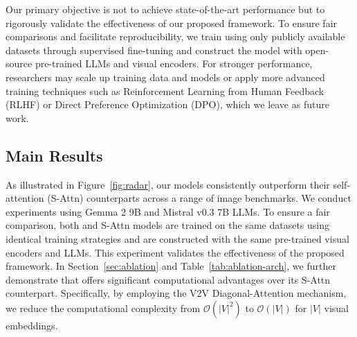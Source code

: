 Our primary objective is not to achieve state-of-the-art performance but to rigorously validate the effectiveness of our proposed \method{} framework.
To ensure fair comparisons and facilitate reproducibility, we train \method{} using only publicly available datasets through supervised fine-tuning and construct the model with open-source pre-trained LLMs and visual encoders.
For stronger performance, researchers may scale up training data and models or apply more advanced training techniques such as Reinforcement Learning from Human Feedback (RLHF)\citep{bai2022training} or Direct Preference Optimization (DPO)\citep{rafailov2024direct}, which we leave as future work.




\subsection{Main Results}

As illustrated in Figure~\ref{fig:radar}, our \method{} models consistently outperform their self-attention (S-Attn) counterparts across a range of image benchmarks.
We conduct experiments using Gemma 2 9B and Mistral v0.3 7B LLMs.
To ensure a fair comparison, both \method{} and S-Attn models are trained on the same datasets using identical training strategies and are constructed with the same pre-trained visual encoders and LLMs.
This experiment validates the effectiveness of the proposed \method{} framework.
In Section~\ref{sec:ablation} and Table~\ref{tab:ablation-arch}, we further demonstrate that \method{} offers significant computational advantages over its S-Attn counterpart.
Specifically, by employing the V2V Diagonal-Attention mechanism, we reduce the computational complexity from $\mathcal{O}(|V|^2)$ to $\mathcal{O}(|V|)$ for $|V|$ visual embeddings.

